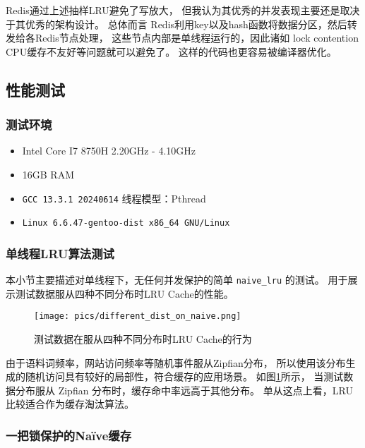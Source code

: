 Redis通过上述抽样LRU避免了写放大，
但我认为其优秀的并发表现主要还是取决于其优秀的架构设计。
总体而言 Redis利用key以及hash函数将数据分区，然后转发给各Redis节点处理，
这些节点内部是单线程运行的，因此诸如 lock contention CPU缓存不友好等问题就可以避免了。
这样的代码也更容易被编译器优化。


\subsection{性能测试}

\subsubsection{测试环境}

\begin{itemize}
    \item Intel Core I7 8750H 2.20GHz - 4.10GHz
    \item 16GB RAM
    \item \verb|GCC 13.3.1 20240614| 线程模型：Pthread
    \item \verb|Linux 6.6.47-gentoo-dist x86_64 GNU/Linux|
\end{itemize}

\subsubsection{单线程LRU算法测试}

本小节主要描述对单线程下，无任何并发保护的简单 \verb|naive_lru| 的测试。
用于展示测试数据服从四种不同分布时LRU Cache的性能。

\begin{figure}
    \centering
    \texttt{[image: pics/different\_dist\_on\_naive.png]}
    \caption{测试数据在服从四种不同分布时LRU Cache的行为}
    \label{fig:4-different-dists-lru-hit-ratio}
\end{figure}

由于语料词频率，网站访问频率等随机事件服从Zipfian分布，
所以使用该分布生成的随机访问具有较好的局部性，符合缓存的应用场景。
如图\ref{fig:4-different-dists-lru-hit-ratio}所示，
当测试数据分布服从 Zipfian 分布时，缓存命中率远高于其他分布。
单从这点上看，LRU比较适合作为缓存淘汰算法。

\subsubsection{一把锁保护的Na\"{i}ve缓存} \label{sec:one-mutex}

